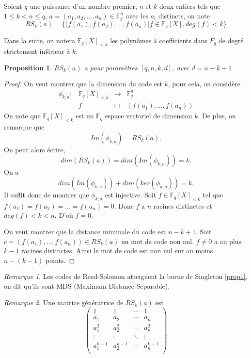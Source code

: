 \documentclass{article}
\newtheorem{proposition}{Proposition}
\theoremstyle{definition}
\theoremstyle{remark}
\newtheorem{remark}{Remarque}
\begin{document}
Soient $q$ une puissance d'un nombre premier, $n$ et $k$ deux entiers tels que $ 1 \le k < n \le q$, $a = (a_{1}, a_{2}, \dots, a_{n}) \in \mathbb{F}_{q}^{n}$ avec les $a_{i}$ distincts, on note
\[ RS_{k}(a) = \{ (f(a_{1}), f(a_{2}), \dots, f(a_{n}) | f \in \mathbb{F}_{q}[X], deg(f) < k \} \]

Dans la suite, on notera $\mathbb{F}_{q}[X]_{< k}$ les polynômes à coefficients dans $F_q$ de degré strictement inférieur à $k$.

\begin{proposition}
\label{prop3}
    $RS_{k}(a)$ a pour paramètres $[q, n, k, d]$, avec $d = n-k+1$
\end{proposition}

\begin{proof}
    On veut montrer que la dimension du code est $k$, pour cela, on considère
    \[ 
    \begin{array}{cccc}
        \phi_{k,a}: & \mathbb{F}_{q}[X]_{< k} & \longrightarrow & \mathbb{F}_{q}^{n}\\
        & f & \longmapsto & (f(a_{1}), \dots, f(a_{n}))
    \end{array}
    \]
    On note que $\mathbb{F}_{q}[X]_{< k}$ est un $\mathbb{F}_{q}$ espace vectoriel de dimension $k$. De plus, on remarque que
    \[ Im(\phi_{k,a}) = RS_{k}(a). \] 
    On peut alors écrire,    
    \[ dim(RS_{k}(a)) = dim(Im(\phi_{k,a})) = k. \]
    On a
    \[ dim(Im(\phi_{k,a})) + dim(ker(\phi_{k,a})) = k. \]
    Il suffit donc de montrer que $\phi_{k,a}$ est injective. Soit $f \in \mathbb{F}_{q}[X]_{< k}$ tel que $f(a_{1}) = f(a_{2}) = \dots = f(a_{n}) = 0$. Donc $f$ a $n$ racines distinctes et $deg(f) < k < n$. D'où $f = 0$.

    On veut montrer que la distance minimale du code est $n-k+1$. Soit $c = (f(a_{1}), \dots, f(a_{n})) \in RS_{k}(a)$ un mot de code non nul. $f \ne 0$ a au plus $k-1$ racines distinctes. Ainsi le mot de code est non nul sur au moins $n - (k - 1)$ points. 
\end{proof}

\begin{remark}
    Les codes de Reed-Solomon atteignent la borne de Singleton \ref{prop1}, on dit qu'ils sont MDS (Maximum Distance Separable).
\end{remark}

\begin{remark}
    Une matrice génératrice de $RS_{k}(a)$ est
    \[ \begin{pmatrix}
        1 & 1 & \cdots & 1 \\
        a_{1} & a_{2} & \cdots & a_{n} \\
        a_{1}^2 & a_{2}^2 & \cdots & a_{n}^2 \\
        \vdots & \vdots & \ddots & \vdots \\
        a_{1}^{k-1} & a_{2}^{k-1} & \cdots & a_{n}^{k-1} \\
    \end{pmatrix} \]
\end{remark}
\end{document}
